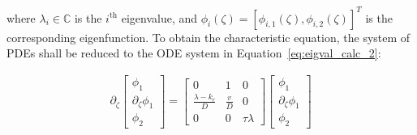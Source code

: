 
where $\lambda_i \in \mathbb{C}$ is the $i^{\text{th}}$ eigenvalue, and $\phi_i(\zeta) = [\phi_{i,1}(\zeta), \phi_{i,2}(\zeta)]^T$ is the corresponding eigenfunction. To obtain the characteristic equation, the system of PDEs shall be reduced to the ODE system in Equation~\ref{eq:eigval_calc_2}:

\begin{equation} \label{eq:eigval_calc_2}
    \begin{aligned}
        \partial_\zeta \begin{bmatrix}
            \phi_1 \\ \partial_\zeta \phi_1 \\ \phi_2
        \end{bmatrix} = \begin{bmatrix}
            0 & 1 & 0 \\
            \frac{\lambda-k_r}{D} & \frac{v}{D} & 0 \\
            0 & 0 & \tau \lambda 
        \end{bmatrix} \begin{bmatrix}
            \phi_1 \\ \partial_\zeta \phi_1 \\ \phi_2
        \end{bmatrix}
    \end{aligned}
\end{equation}

